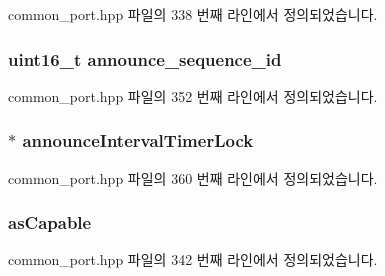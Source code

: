 common\+\_\+port.\+hpp 파일의 338 번째 라인에서 정의되었습니다.

\subsubsection[{\texorpdfstring{announce\+\_\+sequence\+\_\+id}{announce_sequence_id}}]{\setlength{\rightskip}{0pt plus 5cm}uint16\+\_\+t announce\+\_\+sequence\+\_\+id\hspace{0.3cm}{\ttfamily [private]}}\hypertarget{class_common_port_afabedcdb509c1557ade53e68b6ec3f91}{}\label{class_common_port_afabedcdb509c1557ade53e68b6ec3f91}


common\+\_\+port.\+hpp 파일의 352 번째 라인에서 정의되었습니다.

\subsubsection[{\texorpdfstring{announce\+Interval\+Timer\+Lock}{announceIntervalTimerLock}}]{$\ast$ announce\+Interval\+Timer\+Lock\hspace{0.3cm}{\ttfamily [private]}}\hypertarget{class_common_port_a652fe375b2664ee0bedbc5c31a3556df}{}\label{class_common_port_a652fe375b2664ee0bedbc5c31a3556df}


common\+\_\+port.\+hpp 파일의 360 번째 라인에서 정의되었습니다.

\subsubsection[{\texorpdfstring{as\+Capable}{asCapable}}]{ as\+Capable\hspace{0.3cm}{\ttfamily [private]}}\hypertarget{class_common_port_a15a09cf240fb37b905e4d4e1e9f5b9a1}{}\label{class_common_port_a15a09cf240fb37b905e4d4e1e9f5b9a1}


common\+\_\+port.\+hpp 파일의 342 번째 라인에서 정의되었습니다.

